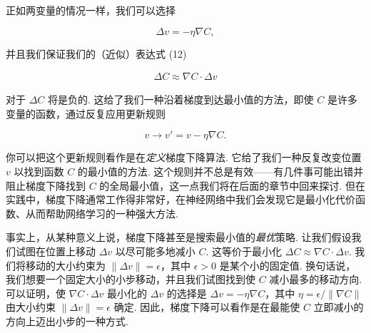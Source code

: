 \noindent 正如两变量的情况一样，我们可以选择

\begin{equation}
\Delta v = -\eta \nabla C,
\tag{14}
\end{equation}

\noindent 并且我们保证我们的（近似）表达式 (12)

\begin{align*}
\Delta C \approx \nabla C \cdot \Delta v \nonumber
\end{align*}

\noindent 对于 $\Delta C$ 将是负的. 这给了我们一种沿着梯度到达最小值的方法，即使 $C$ 是许多变量的函数，通过反复应用更新规则

\begin{equation}
v \rightarrow v' = v-\eta \nabla C.
\tag{15}
\end{equation}

\noindent 你可以把这个更新规则看作是在\emph{定义}梯度下降算法. 它给了我们一种反复改变位置 $v$ 以找到函数 $C$ 的最小值的方法. 这个规则并不总是有效——有几件事可能出错并阻止梯度下降找到 $C$ 的全局最小值，这一点我们将在后面的章节中回来探讨. 但在实践中，梯度下降通常工作得非常好，在神经网络中我们会发现它是最小化代价函数、从而帮助网络学习的一种强大方法.

事实上，从某种意义上说，梯度下降甚至是搜索最小值的\emph{最优}策略. 让我们假设我们试图在位置上移动 $\Delta v$ 以尽可能多地减小 $C$. 这等价于最小化 $\Delta C \approx \nabla C \cdot \Delta v$. 我们将移动的大小约束为 $\| \Delta v \| = \epsilon$，其中 $\epsilon > 0$ 是某个小的固定值. 换句话说，我们想要一个固定大小的小步移动，并且我们试图找到使 $C$ 减小最多的移动方向. 可以证明，使 $\nabla C \cdot \Delta v$ 最小化的 $\Delta v$ 的选择是 $\Delta v = - \eta \nabla C$，其中 $\eta = \epsilon / \|\nabla C\|$ 由大小约束 $\|\Delta v\| = \epsilon$ 确定. 因此，梯度下降可以看作是在最能使 $C$ 立即减小的方向上迈出小步的一种方式.

